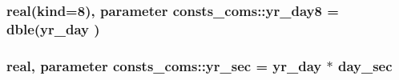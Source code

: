 \subsubsection[{\texorpdfstring{yr\+\_\+day8}{yr_day8}}]{\setlength{\rightskip}{0pt plus 5cm}real(kind=8), parameter consts\+\_\+coms\+::yr\+\_\+day8 = dble({\bf yr\+\_\+day} )}\hypertarget{namespaceconsts__coms_af9fb6bb150a0bc07d04228a98616c962}{}\label{namespaceconsts__coms_af9fb6bb150a0bc07d04228a98616c962}
\subsubsection[{\texorpdfstring{yr\+\_\+sec}{yr_sec}}]{\setlength{\rightskip}{0pt plus 5cm}real, parameter consts\+\_\+coms\+::yr\+\_\+sec = {\bf yr\+\_\+day} $\ast$ {\bf day\+\_\+sec}}\hypertarget{namespaceconsts__coms_ae3a6000a33c9aa556d49b173b86f3b49}{}\label{namespaceconsts__coms_ae3a6000a33c9aa556d49b173b86f3b49}
